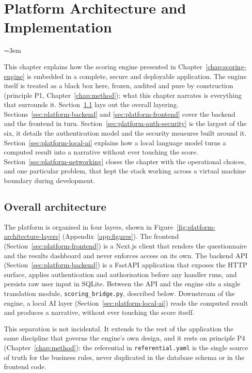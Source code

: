 \chapter{Platform Architecture and Implementation}
\label{chap:platform}
\emergencystretch=3em\relax

This chapter explains how the scoring engine presented in Chapter~\ref{chap:scoring-engine} is embedded in a complete, secure and deployable application. The engine itself is treated as a black box here, frozen, audited and pure by construction (principle P1, Chapter~\ref{chap:method}); what this chapter narrates is everything that surrounds it. Section~\ref{sec:platform-architecture} lays out the overall layering. Sections~\ref{sec:platform-backend} and \ref{sec:platform-frontend} cover the backend and the frontend in turn. Section~\ref{sec:platform-auth-security} is the largest of the six, it details the authentication model and the security measures built around it. Section~\ref{sec:platform-local-ai} explains how a local language model turns a computed result into a narrative without ever touching the score. Section~\ref{sec:platform-networking} closes the chapter with the operational choices, and one particular problem, that kept the stack working across a virtual machine boundary during development.

\section{Overall architecture}
\label{sec:platform-architecture}

The platform is organised in four layers, shown in Figure~\ref{fig:platform-architecture-layers} (Appendix~\ref{app:figures}). The frontend (Section~\ref{sec:platform-frontend}) is a Next.js client that renders the questionnaire and the results dashboard and never enforces access on its own. The backend API (Section~\ref{sec:platform-backend}) is a FastAPI application that exposes the HTTP surface, applies authentication and authorisation before any handler runs, and persists raw user input in SQLite. Between the API and the engine sits a single translation module, \texttt{scoring\_\allowbreak bridge.\allowbreak py}, described below. Downstream of the engine, a local AI layer (Section~\ref{sec:platform-local-ai}) reads the computed result and produces a narrative, without ever touching the score itself.

This separation is not incidental. It extends to the rest of the application the same discipline that governs the engine's own design, and it rests on principle P4 (Chapter~\ref{chap:method}): the referential in \texttt{referential.\allowbreak yaml} is the single source of truth for the business rules, never duplicated in the database schema or in the frontend code.

